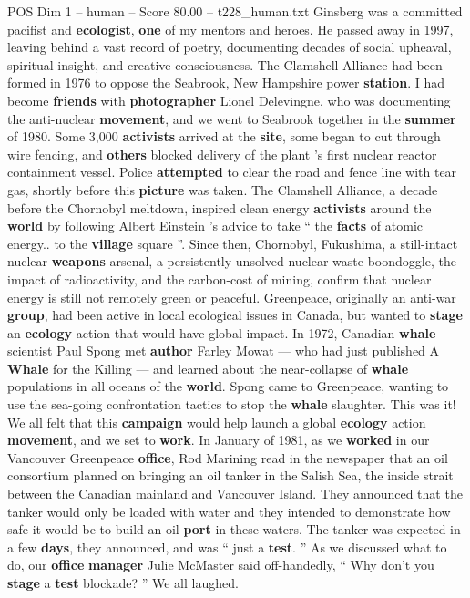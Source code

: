 \begin{textsample}{POS Dim 1 – human – Score 80.00 – t228\_human.txt}
Ginsberg was a committed pacifist and \textbf{ecologist}, \textbf{one} of my mentors and heroes.
He passed away in 1997, leaving behind a vast record of poetry, documenting decades of social upheaval, spiritual insight, and creative consciousness.
The Clamshell Alliance had been formed in 1976 to oppose the Seabrook, New Hampshire power \textbf{station}.
I had become \textbf{friends} with \textbf{photographer} Lionel Delevingne, who was documenting the anti-nuclear \textbf{movement}, and we went to Seabrook together in the \textbf{summer} of 1980.
Some 3,000 \textbf{activists} arrived at the \textbf{site}, some began to cut through wire fencing, and \textbf{others} blocked delivery of the plant ’s first nuclear reactor containment vessel.
Police \textbf{attempted} to clear the road and fence line with tear gas, shortly before this \textbf{picture} was taken.
The Clamshell Alliance, a decade before the Chornobyl meltdown, inspired clean energy \textbf{activists} around the \textbf{world} by following Albert Einstein ’s advice to take “ the \textbf{facts} of atomic energy.. to the \textbf{village} square ”.
Since then, Chornobyl, Fukushima, a still-intact nuclear \textbf{weapons} arsenal, a persistently unsolved nuclear waste boondoggle, the impact of radioactivity, and the carbon-cost of mining, confirm that nuclear energy is still not remotely green or peaceful.
Greenpeace, originally an anti-war \textbf{group}, had been active in local ecological issues in Canada, but wanted to \textbf{stage} an \textbf{ecology} action that would have global impact.
In 1972, Canadian \textbf{whale} scientist Paul Spong met \textbf{author} Farley Mowat — who had just published A \textbf{Whale} for the Killing — and learned about the near-collapse of \textbf{whale} populations in all oceans of the \textbf{world}.
Spong came to Greenpeace, wanting to use the sea-going confrontation tactics to stop the \textbf{whale} slaughter.
This was it!
We all felt that this \textbf{campaign} would help launch a global \textbf{ecology} action \textbf{movement}, and we set to \textbf{work}.
In January of 1981, as we \textbf{worked} in our Vancouver Greenpeace \textbf{office}, Rod Marining read in the newspaper that an oil consortium planned on bringing an oil tanker in the Salish Sea, the inside strait between the Canadian mainland and Vancouver Island.
They announced that the tanker would only be loaded with water and they intended to demonstrate how safe it would be to build an oil \textbf{port} in these waters.
The tanker was expected in a few \textbf{days}, they announced, and was “ just a \textbf{test}. ” As we discussed what to do, our \textbf{office} \textbf{manager} Julie McMaster said off-handedly, “ Why don't you \textbf{stage} a \textbf{test} blockade? ” We all laughed.

\end{textsample}
